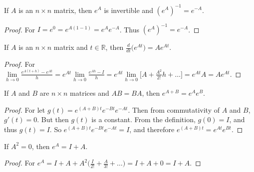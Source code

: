 \documentclass[crop=false,class=book,oneside]{standalone}
\begin{document}
        \begin{theorem}
        If $A$ is an $n\times n$ matrix, then $e^A$ is invertible and $(e^A)^{-1} = e^{-A}$.
        \end{theorem}
        \begin{proof}
        For $I = e^{0} = e^{A(1-1)} = e^Ae^{-A}$. Thus $(e^{A})^{-1} = e^{-A}$.
        \end{proof}
        \begin{theorem}
        If $A$ is an $n\times n$ matrix and $t\in \mathbb{R}$, then $\frac{d}{dt}\big(e^{At}\big) = Ae^{At}$.
        \end{theorem}
        \begin{proof}
        For $\underset{h\rightarrow 0}\lim \frac{e^{A(t+h)}-e^{At}}{h} = e^{At}\underset{h\rightarrow 0}\lim \frac{e^{Ah}-I}{h} = e^{At}\underset{h\rightarrow 0}\lim\big[A+\frac{A^2}{2!}h+\hdots\big] = e^{At}A = Ae^{At}$.
        \end{proof}
        \begin{theorem}
        If $A$ and $B$ are $n\times n$ matrices and $AB=BA$, then $e^{A+B} = e^{A}e^{B}$.
        \end{theorem}
        \begin{proof}
        For let $g(t) = e^{(A+B)t}e^{-Bt}e^{-At}$. Then from commutativity of $A$ and $B$, $g'(t) = 0$. But then $g(t)$ is a constant. From the definition, $g(0) = I$, and thus $g(t) = I$. So $e^{(A+B)t}e^{-Bt}e^{-At} = I$, and therefore $e^{(A+B)t} = e^{At}e^{Bt}$.
        \end{proof}
        \begin{theorem}
        If $A^{2} = 0$, then $e^{A} = I+A$.
        \end{theorem}
        \begin{proof}
        For $e^{A} = I+A+A^{2}\big(\frac{I}{2!}+\frac{A}{3!}+\hdots\big) = I+A+0 = I+A$.
        \end{proof}
\end{document}
